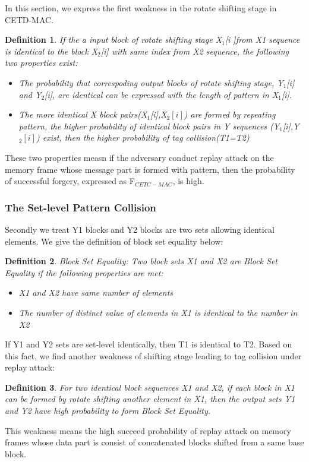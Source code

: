 \documentclass{article}
\newtheorem{defination}{Definition}[section]
\begin{document}
In this section, we express the first weakness in the rotate shifting stage in CETD-MAC. 
\begin{defination}
If the a input block of rotate shifting stage X$_1$[i ]from X1 sequence is identical to the block X$_2$[i] with same index from X2 sequence, the following two properties exist:
\begin{itemize}
	\item The probability that correspoding output blocks of rotate shifting stage, Y$_1$[i] and Y$_2$[i], are identical can be expressed with the length of pattern in X$_1$[i].	
	\item The more identical X block pairs(X$_1$[i],X$_2[i]$) are formed by repeating pattern, the higher probability of identical block pairs in Y sequences (Y$_1$[i],Y$_2[i]$) exist, then the higher probability of tag collision(T1=T2)
\end{itemize}
\end{defination}
These two properties measn if the adversary conduct replay attack on the memory frame whose message part is formed with pattern, then the probability of successful forgery, expressed as F$_{CETC-MAC}$, is high.

\subsubsection{The Set-level Pattern Collision}
Secondly we treat Y1 blocks and Y2 blocks are two sets allowing identical elements. We give the definition of block set equality below:
\begin{defination}
Block Set Equality: Two block sets X1 and X2 are Block Set Equality if the following properties are met:
\begin{itemize}
	\item X1 and X2 have same number of elements
	\item The number of distinct value of elements in X1 is identical to the number in X2
\end{itemize}
\end{defination}
If Y1 and Y2 sets are set-level identically, then T1 is identical to T2. Based on this fact, we find another weakness of shifting stage leading to tag collision under replay attack:
\begin{defination}
For two identical block sequences X1 and X2, if each block in X1 can be formed by rotate shifting another element in X1, then the output sets Y1 and Y2 have high probability to form Block Set Equality.
\end{defination}
This weakness means the high succeed probability of replay attack on memory frames whose data part is consist of concatenated blocks shifted from a same base block. 
\end{document}
